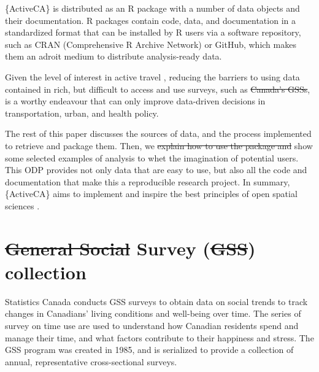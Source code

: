 \documentclass[Royal,times,sageh]{sagej}
\providecommand{\DIFaddtex}[1]{{\protect\color{blue}\uwave{#1}}} %
\providecommand{\DIFdeltex}[1]{{\protect\color{red}\sout{#1}}} %
\providecommand{\DIFaddbegin}{} %
\providecommand{\DIFaddend}{} %
\providecommand{\DIFdelbegin}{} %
\providecommand{\DIFdelend}{} %
\providecommand{\DIFadd}[1]{\texorpdfstring{\DIFaddtex{#1}}{#1}} %
\providecommand{\DIFdel}[1]{\texorpdfstring{\DIFdeltex{#1}}{}} %
\begin{document}
\{ActiveCA\} is distributed as an R package with a number of data
objects and their documentation. R packages contain code, data, and
documentation in a standardized format that can be installed by R users
via a software repository, such as CRAN (Comprehensive R Archive
Network) or GitHub, which makes them an adroit medium to distribute
analysis-ready data.

Given the level of interest in active travel
\citep[e.g.,][]{mccurdySupport2023}, reducing the barriers to using data
contained in rich, but difficult to access and use surveys, such as \DIFdelbegin \DIFdel{Canada's GSSs}\DIFdelend \DIFaddbegin \DIFadd{TUS}\DIFaddend ,
is a worthy endeavour that can only improve data-driven decisions in
transportation, urban, and health policy.

The rest of this paper discusses the sources of data, and the process
implemented to retrieve and package them. Then, we \DIFdelbegin \DIFdel{explain how to use
the package and }\DIFdelend show some selected
examples of analysis to whet the imagination of potential users. This
ODP provides not only data that are easy to use, but also all the code
and documentation that make this a reproducible research project. In
summary, \{ActiveCA\} aims to implement and inspire the best principles
of open spatial sciences \citep{paez_open_2021, brunsdon_opening_2021}.

\section{\DIFdelbegin \DIFdel{General Social }\DIFdelend \DIFaddbegin \DIFadd{The Time Use }\DIFaddend Survey (\DIFdelbegin \DIFdel{GSS}\DIFdelend \DIFaddbegin \DIFadd{TUS}\DIFaddend )
collection}\DIFdelbegin %
\DIFdelend \DIFaddbegin \label{the-time-use-survey-tus-collection}
\DIFaddend 

Statistics Canada \citeyearpar{statisticscanada2024} conducts GSS
surveys to obtain data on social trends to track changes in Canadians'
living conditions and well-being over time. The series of survey on time
use are used to understand how Canadian residents spend and manage their
time, and what factors contribute to their happiness and stress. The GSS
program was created in 1985, and is serialized to provide a collection
of annual, representative cross-sectional surveys.
\end{document}
